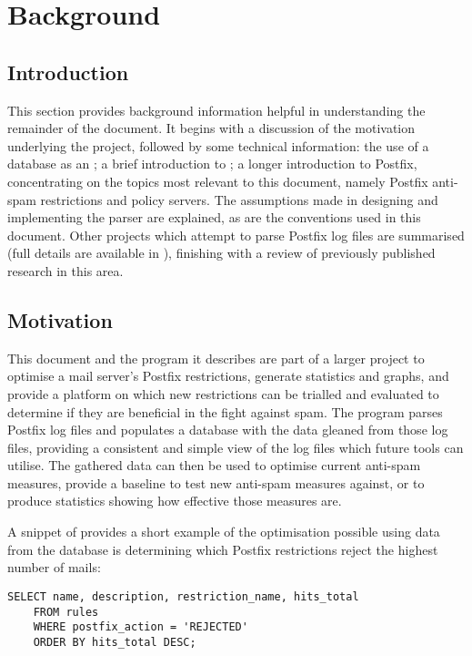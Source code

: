 \section{Background}

\label{background}

\subsection{Introduction}

This section provides background information helpful in understanding the
remainder of the document.  It begins with a discussion of the motivation
underlying the project, followed by some technical information: the use of
a database as an \API{}\@; a brief introduction to \SMTP{}\@; a longer
introduction to Postfix, concentrating on the topics most relevant to this
document, namely Postfix anti-spam restrictions and policy servers.  The
assumptions made in designing and implementing the parser are explained, as
are the conventions used in this document.  Other projects which attempt to
parse Postfix log files are summarised (full details are available in
), finishing with a review of previously
published research in this area.

\subsection{Motivation}

\label{motivation}

This document and the program it describes are part of a larger project to
optimise a mail server's Postfix restrictions, generate statistics and
graphs, and provide a platform on which new restrictions can be trialled
and evaluated to determine if they are beneficial in the fight against
spam.  The program parses Postfix log files and populates a database with
the data gleaned from those log files, providing a consistent and simple
view of the log files which future tools can utilise.  The gathered data
can then be used to optimise current anti-spam measures, provide a baseline
to test new anti-spam measures against, or to produce statistics showing
how effective those measures are.

A snippet of \SQL{} provides a short example of the optimisation possible
using data from the database is determining which Postfix restrictions
reject the highest number of mails:

\begin{verbatim}
SELECT name, description, restriction_name, hits_total
    FROM rules
    WHERE postfix_action = 'REJECTED'
    ORDER BY hits_total DESC;
\end{verbatim}

